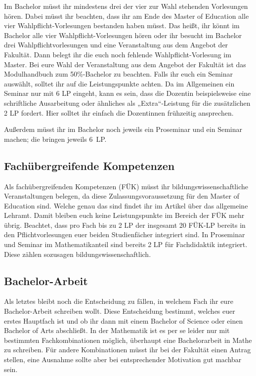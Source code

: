 Im Bachelor müsst ihr mindestens drei der vier zur Wahl stehenden Vorlesungen hören. Dabei müsst ihr beachten, dass ihr am Ende des Master of Education alle vier Wahlpflicht-Vorlesungen bestanden haben müsst. Das heißt, ihr könnt im Bachelor alle vier Wahlpflicht-Vorlesungen hören oder ihr besucht im Bachelor drei Wahlpflichtvorlesungen und eine Veranstaltung aus dem Angebot der Fakultät. Dann belegt ihr die euch noch fehlende Wahlpflicht-Vorlesung im Master. Bei eure Wahl der Veranstaltung aus dem Angebot der Fakultät ist das Modulhandbuch zum 50\%-Bachelor zu beachten. Falls ihr euch ein Seminar auswählt, solltet ihr auf die Leistungspunkte achten. Da im Allgemeinen ein Seminar nur mit 6 \gls{LP} eingeht, kann es sein, dass die Dozentin beispielsweise eine schriftliche Ausarbeitung oder ähnliches als „Extra“-Leistung für die zusätzlichen 2 \gls{LP} fordert. Hier solltet ihr einfach die Dozentinnen frühzeitig ansprechen.

Außerdem müsst ihr im Bachelor noch jeweils ein Proseminar und ein Seminar machen; die bringen jeweils 6~\gls{LP}.

\subsection{Fachübergreifende Kompetenzen}

Als fachübergreifenden Kompetenzen (FÜK) müsst ihr bildungswissenschaftliche Veranstaltungen belegen, da diese Zulassungsvoraussetzung für den Master of Education sind. Welche genau das sind findet ihr im Artikel über das allgemeine Lehramt. Damit bleiben euch keine Leistungspunkte im Bereich der FÜK mehr übrig. Beachtet, dass pro Fach bis zu 2 \gls{LP} der insgesamt 20 FÜK-\gls{LP} bereits in den Pflichtvorlesungen euer beiden Studienfächer integriert sind. In Proseminar und Seminar im Mathematikanteil sind bereits 2 \gls{LP} für Fachdidaktik integriert. Diese zählen sozusagen bildungswissenschaftlich.

\subsection{Bachelor-Arbeit}

Als letztes bleibt noch die Entscheidung zu fällen, in welchem Fach ihr eure Bachelor-Arbeit schreiben wollt. Diese Entscheidung bestimmt, welches euer erstes Hauptfach ist und ob ihr dann mit einem Bachelor of Science oder einen Bachelor of Arts abschließt. In der Mathematik ist es per se leider nur mit bestimmten Fachkombinationen möglich, überhaupt eine Bachelorarbeit in Mathe zu schreiben. Für andere Kombinationen müsst ihr bei der Fakultät einen Antrag stellen, eine Ausnahme sollte aber bei entsprechender Motivation gut machbar sein.

